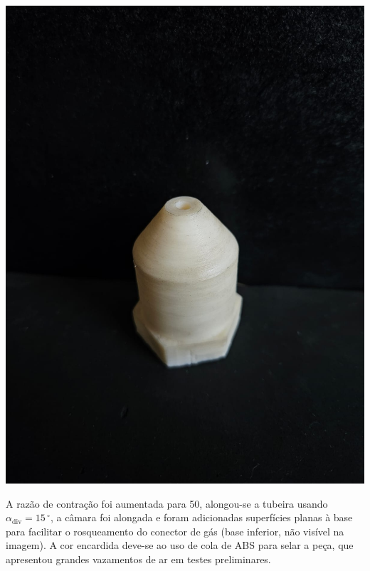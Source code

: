 \begin{minipage}{.49\textwidth}
    \includegraphics[width=\textwidth]{img/app_dev_history/motor2.jpeg}
\end{minipage}
\begin{minipage}{.49\textwidth}
    A razão de contração foi aumentada para 50, alongou-se a tubeira usando \(\alpha_{\mathrm{div}} = 15\,\mathrm{^\circ}\), a câmara foi alongada e foram adicionadas superfícies planas à base para facilitar o rosqueamento do conector de gás (base inferior, não visível na imagem). A cor encardida deve-se ao uso de cola de ABS para selar a peça, que apresentou grandes vazamentos de ar em testes preliminares.
\end{minipage}

